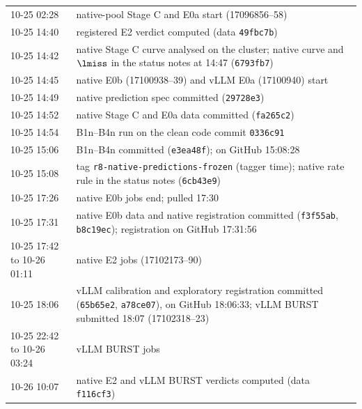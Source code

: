\begin{table}[p]
\begin{tabular}{@{}p{1.75cm} >{\raggedright\arraybackslash}p{5.6cm}@{}}
10-25 02:28 & native-pool Stage C and E0a start (17096856--58)\\
10-25 14:40 & registered E2 verdict computed (data \texttt{49fbc7b})\\
10-25 14:42 & native Stage C curve analysed on the cluster; native curve and $\lmiss$ in the status notes at 14:47 (\texttt{6793fb7})\\
10-25 14:45 & native E0b (17100938--39) and vLLM E0a (17100940) start\\
10-25 14:49 & native prediction spec committed (\texttt{29728e3})\\
10-25 14:52 & native Stage C and E0a data committed (\texttt{fa265c2})\\
10-25 14:54 & B1n--B4n run on the clean code commit \texttt{0336c91}\\
10-25 15:06 & B1n--B4n committed (\texttt{e3ea48f}); on GitHub 15:08:28\\
10-25 15:08 & tag \texttt{r8-native-predictions-frozen} (tagger time); native rate rule in the status notes (\texttt{6cb43e9})\\
10-25 17:26 & native E0b jobs end; pulled 17:30\\
10-25 17:31 & native E0b data and native registration committed (\texttt{f3f55ab}, \texttt{b8c19ec}); registration on GitHub 17:31:56\\
10-25 17:42 to 10-26 01:11 & native E2 jobs (17102173--90)\\
10-25 18:06 & vLLM calibration and exploratory registration committed (\texttt{65b65e2}, \texttt{a78ce07}), on GitHub 18:06:33; vLLM BURST submitted 18:07 (17102318--23)\\
10-25 22:42 to 10-26 03:24 & vLLM BURST jobs\\
10-26 10:07 & native E2 and vLLM BURST verdicts computed (data \texttt{f116cf3})\\
\bottomrule
\end{tabular}
\end{table}

